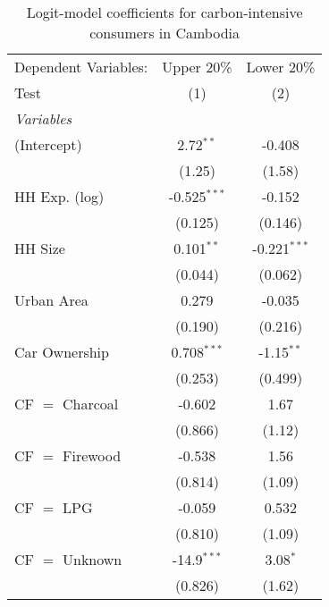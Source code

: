 
\begin{table}[htbp!]
   \centering
   \small
   \begin{adjustbox}{width = 1\textwidth, max height = 0.95\textheight, center}
      \begin{threeparttable}[b]
         \caption{\label{tab:Logit_1_KHM} Logit-model coefficients for carbon-intensive consumers in Cambodia}
         \begin{tabular}{lcc}
            \tabularnewline \midrule \midrule
            Dependent Variables: & Upper 20\%     & Lower 20\%\\   
            Test                 & (1)            & (2)\\  
            \midrule
            \emph{Variables}\\
            (Intercept)          & 2.72$^{**}$    & -0.408\\   
                                 & (1.25)         & (1.58)\\   
            HH Exp. (log)        & -0.525$^{***}$ & -0.152\\   
                                 & (0.125)        & (0.146)\\   
            HH Size              & 0.101$^{**}$   & -0.221$^{***}$\\   
                                 & (0.044)        & (0.062)\\   
            Urban Area           & 0.279          & -0.035\\   
                                 & (0.190)        & (0.216)\\   
            Car Ownership        & 0.708$^{***}$  & -1.15$^{**}$\\   
                                 & (0.253)        & (0.499)\\   
            CF $=$ Charcoal      & -0.602         & 1.67\\   
                                 & (0.866)        & (1.12)\\   
            CF $=$ Firewood      & -0.538         & 1.56\\   
                                 & (0.814)        & (1.09)\\   
            CF $=$ LPG           & -0.059         & 0.532\\   
                                 & (0.810)        & (1.09)\\   
            CF $=$ Unknown       & -14.9$^{***}$  & 3.08$^{*}$\\   
                                 & (0.826)        & (1.62)\\   

\end{tabular}
\end{threeparttable}
\end{adjustbox}
\end{table}
